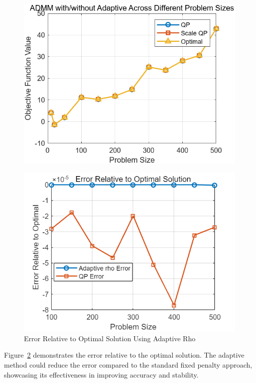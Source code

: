 \documentclass{article}
\begin{document}
\begin{figure}[H]
    \centering
    \includegraphics[width=0.75\linewidth]{fig/ADMM_Adaptive_rho.png}
    \caption{}
    \label{fig:Adaptive}
\end{figure}
\begin{figure}[H]
    \centering
    \includegraphics[width=0.75\linewidth]{fig/ADMM_Adaptive_rho_Error.png}
    \caption{Error Relative to Optimal Solution Using Adaptive Rho}
    \label{fig:Adaptive_Error}
\end{figure}

Figure~\ref{fig:Adaptive_Error} demonstrates the error relative to the optimal solution. The adaptive method could reduce the error compared to the standard fixed penalty approach, showcasing its effectiveness in improving accuracy and stability.



\end{document}
